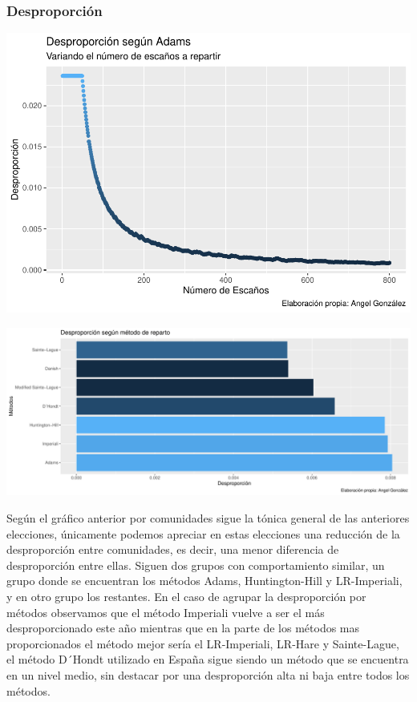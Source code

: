 \documentclass[12pt,a4paper,]{book}
\numberwithin{dummy}{section}
\theoremstyle{ocrenumbox}
\theoremstyle{blacknumex}
\theoremstyle{blacknumbox}
\theoremstyle{ocrenum}
\theoremstyle{ocrenum}
\begin{document}
\hypertarget{desproporciuxf3n-8}{%
\subsubsection{Desproporción}\label{desproporciuxf3n-8}}

\begin{center}\includegraphics[width=1\linewidth]{figurasR/unnamed-chunk-30-1} \end{center}

\begin{center}\includegraphics[width=1\linewidth]{figurasR/unnamed-chunk-30-2} \end{center}

Según el gráfico anterior por comunidades sigue la tónica general de las
anteriores elecciones, únicamente podemos apreciar en estas elecciones
una reducción de la desproporción entre comunidades, es decir, una menor
diferencia de desproporción entre ellas. Siguen dos grupos con
comportamiento similar, un grupo donde se encuentran los métodos Adams,
Huntington-Hill y LR-Imperiali, y en otro grupo los restantes. En el
caso de agrupar la desproporción por métodos observamos que el método
Imperiali vuelve a ser el más desproporcionado este año mientras que en
la parte de los métodos mas proporcionados el método mejor sería el
LR-Imperiali, LR-Hare y Sainte-Lague, el método D´Hondt utilizado en
España sigue siendo un método que se encuentra en un nivel medio, sin
destacar por una desproporción alta ni baja entre todos los métodos.
\end{document}
